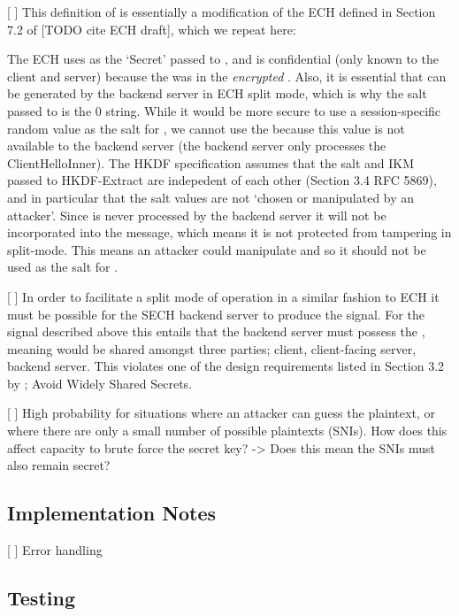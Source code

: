 [ ] This definition of  is essentially a modification of the ECH  defined in Section 7.2 of [TODO cite ECH draft], which we repeat here:

The ECH  uses  as the `Secret' passed to , and  is confidential (only known to the client and server) because the  was in the {\em encrypted} . Also, it is essential that  can be generated by the backend server in ECH split mode, which is why the salt passed to  is the 0 string. While it would be more secure to use a session-specific random value as the salt for , we cannot use the  because this value is not available to the backend server (the backend server only processes the ClientHelloInner). The HKDF specification assumes that the salt and IKM passed to HKDF-Extract are indepedent of each other (Section 3.4 RFC 5869), and in particular that the salt values are not `chosen or manipulated by an attacker'.
Since  is never processed by the backend server it will not be incorporated into the  message, which means it is not protected from tampering in split-mode. This means an attacker could manipulate  and so it should not be used as the salt for .

[ ] In order to facilitate a split mode of operation in a similar fashion to ECH it must be possible for the SECH backend server to produce  the  signal. For the signal described above this entails that the backend server must possess the , meaning  would be shared amongst three parties; client, client-facing server, backend server. This violates one of the design requirements listed in Section 3.2 by \cite{rfc8744-issues}; Avoid Widely Shared Secrets.

[ ] High probability for situations where an attacker can guess the plaintext, or where there are only a small number of possible plaintexts (SNIs). How does this affect capacity to brute force the secret key? -> Does this mean the SNIs must also remain secret?

\subsection{Implementation Notes}

[ ] Error handling
\subsection{Testing}